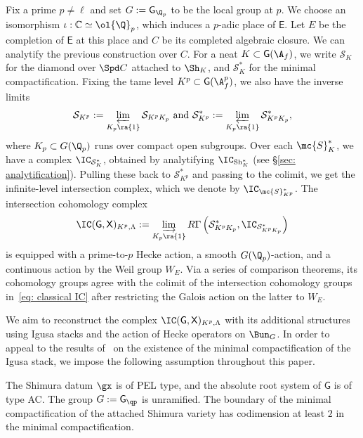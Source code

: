 \documentclass[letterpaper,11pt]{amsart}
\begin{document}
Fix a prime $p\not = \ell$ and set $G:=\mathsf{G}_{\Q_p}$ to be the local group at $p$. 
We choose an isomorphism $\iota: \mathbb{C}\simeq \ol{\Q}_p$, which induces a $p$-adic place of $\mathsf{E}$. Let $E$ be the completion of $\mathsf{E}$ at this place and $C$ be its completed algebraic closure. We can analytify the previous construction over $C$. For a neat $K\subset \mathsf{G}(\A_f)$, we write $\mathcal{S}_{K}$ for the diamond over $\Spd C$ attached to $\Sh_K$, and $\mathcal{S}^*_{K}$ for the minimal compactification. 
Fixing the tame level $K^p\subset \mathsf{G}(\A_f^p)$, we also have the inverse limits
\[
\mathcal{S}_{K^p}:= \varprojlim_{K_p\ra \{1\}} \mathcal{S}_{K^pK_p}\ \mathrm{and}\  \mathcal{S}^*_{K^p}:= \varprojlim_{K_p\ra \{1\}} \mathcal{S}^*_{K^pK_p},
\]
where $K_p\subset G(\Q_p)$ runs over compact open subgroups. Over each $\mc{S}^*_{K}$, we have a complex $\IC_{\mathcal{S}_{K}^*}$, obtained by analytifying $\IC_{\mathrm{Sh}_K^*}$ (see \S \ref{sec: analytification}). Pulling these back to $ \mathcal{S}_{K^p}^*$ and passing to the colimit, we get the infinite-level intersection complex, which we denote by $\IC_{\mc{S}_{K^p}^*}$.
The intersection cohomology complex
\[
\IC(\mathsf{G}, \mathsf{X})_{K^p,\Lambda}:= \varinjlim_{K_p\ra \{1\}} R\Gamma\left(\mathcal{S}_{K^pK_p}^*, \IC_{\mathcal{S}^*_{K^pK_p}} \right)
\]
is equipped with a prime-to-$p$ Hecke action, a smooth $G(\Q_p)$-action, and a continuous action by the Weil group $W_E$. Via a series of comparison theorems, its cohomology groups agree with the colimit of the intersection cohomology groups in~\eqref{eq: classical IC} after restricting the Galois action on the latter to $W_E$. 

We aim to reconstruct the complex $\IC(\mathsf{G}, \mathsf{X})_{K^p,\Lambda}$ with its additional structures using Igusa stacks and the action of Hecke operators on $\Bun_{G}$. In order to appeal to the results of~\cite{zhang2023} on the existence of the minimal compactification 
of the Igusa stack, we impose the following assumption throughout 
this paper. 


\begin{assumption}\label{assumption:codimension}
    The Shimura datum $\gx$ is of PEL type, and the absolute root system of $\mathsf{G}$ is of type AC. The group $G :=\mathsf{G}_{\qp}$  is unramified. The boundary of the minimal compactification of the attached Shimura variety has codimension at least $2$ in the minimal compactification.
\end{assumption}
\end{document}
